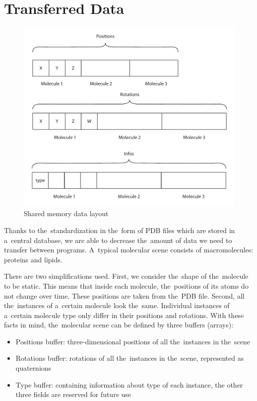\documentclass[
  digital, %
  table,   %
  nolof,     %
  nolot,     %
  oneside,
]{fithesis3}
\begin{document}
\section{Transferred Data}
\begin{figure}
  \centering
  \includegraphics[scale=0.5]{images/data-layout-all.pdf}
  \caption{Shared memory data layout}
  \label{fig:memory-layout}
\end{figure}

Thanks to the standardization in the form of PDB files which are stored in a central database, we are able to decrease the amount of data we need to transfer between programs. A typical molecular scene consists of macromolecules: proteins and lipids.

There are two simplifications used. First, we consider the shape of the molecule to be static. This means that inside each molecule, the positions of its atoms do not change over time. These positions are taken from the PDB file. Second, all the instances of a certain molecule look the same. Individual instances of a certain molecule type only differ in their positions and rotations. With these facts in mind, the molecular scene can be defined by three buffers (arrays):
\begin{itemize}
\item Positions buffer: three-dimensional positions of all the instances in the scene
\item Rotations buffer: rotations of all the instances in the scene, represented as quaternions
\item Type buffer: containing information about type of each instance, the other three fields are reserved for future use
\end{itemize}
\end{document}
